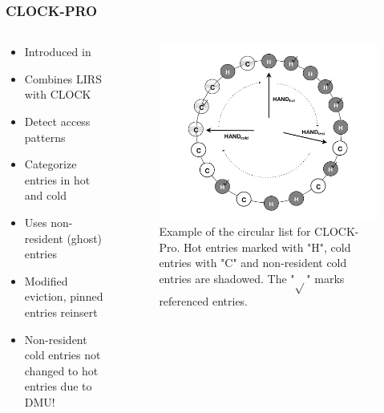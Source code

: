 \documentclass[
	aspectratio=169,
	compress,
]{beamer}
\newcommand{\navframetitle}[1]{\frametitle{#1\hfill{\footnotesize\lastsection{}}}}
\begin{document}
\begin{frame}
	\navframetitle{CLOCK-PRO}

	\begin{columns}
		\begin{column}{0.5\textwidth}
			\begin{itemize}
				\item Introduced in \cite{jiang2005clock}			
				\item Combines LIRS with CLOCK
				\item Detect access patterns
				\item Categorize entries in hot and cold
				\item Uses non-resident (ghost) entries
				\item Modified eviction, pinned entries reinsert
				\item Non-resident cold entries not changed to hot entries due to DMU!
			\end{itemize}
		\end{column}
		\begin{column}{0.5\textwidth}
			\begin{figure}[ht]
    			\centering
    			\includegraphics[scale=0.1]{clock_pro.png}
    			\caption{Example of the circular list for CLOCK-Pro. Hot entries marked with "H", cold entries with "C" and non-resident cold entries are shadowed.
    The "$\sqrt{}$" marks referenced entries.}
        		\label{fig:clock in clock-pro}
			\end{figure}			
		\end{column}
	\end{columns}
\end{frame}
\end{document}
